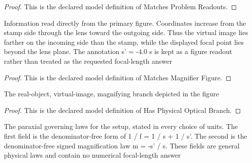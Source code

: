 \begin{proof}
  This is the declared model definition of Matches Problem Readouts.
\end{proof}
\begin{definition}
  \label{def:physics:phyx-mini-0058:phyxminiproblems-problemphyxmini0058-matchesmagnifierfigure}
  Information read directly from the primary figure. Coordinates increase from the stamp side through the lens toward the outgoing side. Thus the virtual image lies farther on the incoming side than the stamp, while the displayed focal point lies beyond the lens plane. The annotation s' = -4.0 s is kept as a figure readout rather than treated as the requested focal-length answer
\end{definition}
\begin{proof}
  This is the declared model definition of Matches Magnifier Figure.
\end{proof}
\begin{definition}
  \label{def:physics:phyx-mini-0058:phyxminiproblems-problemphyxmini0058-hasphysicalopticalbranch}
  The real-object, virtual-image, magnifying branch depicted in the figure
\end{definition}
\begin{proof}
  This is the declared model definition of Has Physical Optical Branch.
\end{proof}
\begin{definition}
  \label{def:physics:phyx-mini-0058:phyxminiproblems-problemphyxmini0058-satisfiesparaxialthinlenslaws}
  The paraxial governing laws for the setup, stated in every choice of units. The first field is the denominator-free form of 1 / f = 1 / s + 1 / s'. The second is the denominator-free signed magnification law m = -s' / s. These fields are general physical laws and contain no numerical focal-length answer
\end{definition}
